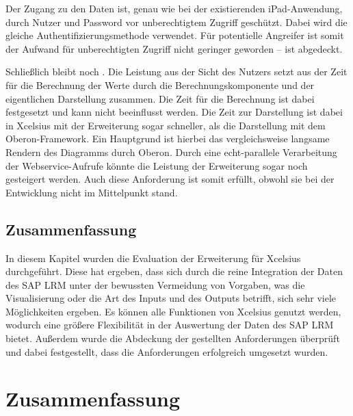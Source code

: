 \begin{onehalfspacing}
Der Zugang zu den Daten ist, genau wie bei der existierenden iPad-Anwendung, durch Nutzer und Password vor unberechtigtem Zugriff geschützt. Dabei wird die gleiche Authentifizierungsmethode verwendet. Für potentielle Angreifer ist somit der Aufwand für unberechtigten Zugriff nicht geringer geworden --  ist abgedeckt.

Schließlich bleibt noch . Die Leistung aus der Sicht des Nutzers setzt aus der Zeit für die Berechnung der Werte durch die Berechnungskomponente und der eigentlichen Darstellung zusammen. Die Zeit für die Berechnung ist dabei festgesetzt und kann nicht beeinflusst werden. Die Zeit zur Darstellung ist dabei in Xcelsius mit der Erweiterung sogar schneller, als die Darstellung mit dem Oberon-Framework. Ein Hauptgrund ist hierbei das vergleichsweise langsame Rendern des Diagramms durch Oberon. Durch eine echt-parallele Verarbeitung der Webservice-Aufrufe könnte die Leistung der Erweiterung sogar noch gesteigert werden. Auch diese Anforderung ist somit erfüllt, obwohl sie bei der Entwicklung nicht im Mittelpunkt stand.

\section{Zusammenfassung}
In diesem Kapitel wurden die Evaluation der Erweiterung für Xcelsius durchgeführt. Diese hat ergeben, dass sich durch die reine Integration der Daten des SAP LRM unter der bewussten Vermeidung von Vorgaben, was die Visualisierung oder die Art des Inputs und des Outputs betrifft, sich sehr viele Möglichkeiten ergeben. Es können alle Funktionen von Xcelsius genutzt werden, wodurch eine größere Flexibilität in der Auswertung der Daten des SAP LRM bietet. Außerdem wurde die Abdeckung der gestellten Anforderungen überprüft und dabei festgestellt, dass die Anforderungen erfolgreich umgesetzt wurden.

\chapter{Zusammenfassung}
\loreIpsum

\loreIpsum

\loreIpsum

\loreIpsum

\end{onehalfspacing}



